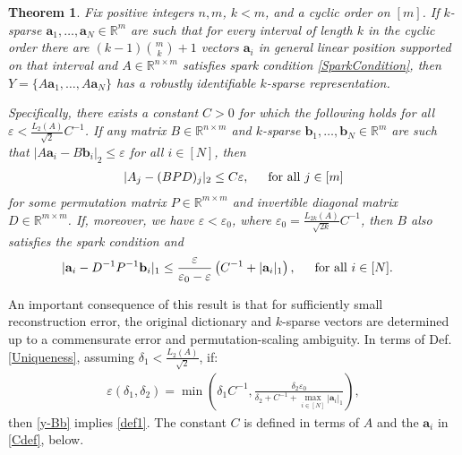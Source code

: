 \documentclass[journal, onecolumn]{IEEEtran}
\newtheorem{theorem}{Theorem}
\begin{document}
\begin{theorem}\label{DeterministicUniquenessTheorem}
Fix positive integers $n, m$, $k < m$, and a cyclic order on $[m]$. If $k$-sparse $\mathbf{a}_1, \ldots, \mathbf{a}_N \in \mathbb{R}^m$ are such that for every interval of length $k$ in the cyclic order there are $(k-1){m \choose k}+1$ vectors $\mathbf{a}_i$ in general linear position supported on that interval and $A \in \mathbb{R}^{n \times m}$ satisfies spark condition \eqref{SparkCondition}, then $Y = \{A\mathbf{a}_1, \ldots, A\mathbf{a}_N\}$ has a robustly identifiable $k$-sparse representation.

Specifically, there exists a constant $C > 0$ for which the following holds for all $\varepsilon < \frac{L_2(A)}{\sqrt{2}}C^{-1}$. If any matrix $B \in \mathbb{R}^{n \times m}$ and $k$-sparse $\mathbf{b}_1, \ldots, \mathbf{b}_N \in \mathbb{R}^m$ are such that $|A\mathbf{a}_i - B\mathbf{b}_i|_2 \leq \varepsilon$ for all $i \in [N]$, then
\begin{align}\label{Cstable}
|A_j-(BPD)_j|_2 \leq C\varepsilon,\indent  \text{for all } j \in [m]
\end{align}
%
for some permutation matrix $P \in \mathbb{R}^{m \times m}$ and invertible diagonal matrix $D \in \mathbb{R}^{m \times m}$. If, moreover, we have $\varepsilon < \varepsilon_0$, where $\varepsilon_0 = \frac{L_{2k}(A)}{\sqrt{2k}}C^{-1}$, then $B$ also satisfies the spark condition and
\begin{align}\label{b-PDa}
|\mathbf{a}_i - D^{-1}P^{-1}\mathbf{b}_i|_1 &\leq \frac{\varepsilon }{ \varepsilon_0 - \varepsilon} \left( C^{-1}+|\mathbf{a}_i|_1 \right),\indent  \text{for all } i \in [N].
\end{align}
\end{theorem}
An important consequence of this result is that for sufficiently small reconstruction error, the original dictionary and $k$-sparse vectors are determined up to a commensurate error and permutation-scaling ambiguity. In terms of Def. \ref{Uniqueness}, assuming $\delta_1 < \frac{L_2(A)}{\sqrt{2}}$, if:
\begin{align}\label{epsd1d2}
\varepsilon(\delta_1, \delta_2) =  \min \left( \delta_1 C^{-1}, \frac{ \delta_2 \varepsilon_0}{\delta_2 + C^{-1} + \max_{i \in [N]} |\mathbf{a}_i|_1}\right),
\end{align}
%
then \eqref{y-Bb} implies \eqref{def1}. The constant $C$ is defined in terms of $A$ and the $\mathbf{a}_i$ in \eqref{Cdef}, below. 
\end{document}
